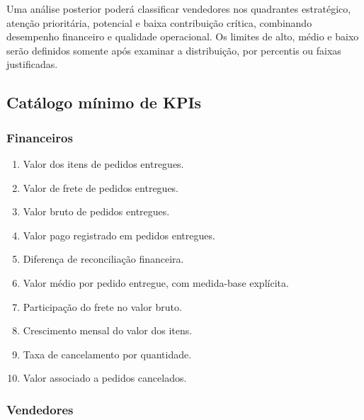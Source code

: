 \documentclass[12pt,a4paper]{article}
\providecommand{\tightlist}{
  \setlength{\itemsep}{0pt}\setlength{\parskip}{0pt}
}
\begin{document}
Uma análise posterior poderá classificar vendedores nos quadrantes
estratégico, atenção prioritária, potencial e baixa contribuição
crítica, combinando desempenho financeiro e qualidade operacional. Os
limites de alto, médio e baixo serão definidos somente após examinar a
distribuição, por percentis ou faixas justificadas.

\subsection{Catálogo mínimo de
KPIs}\label{docs__analytics__contrato_analitico.md__catuxe1logo-muxednimo-de-kpis}

\subsubsection{Financeiros}\label{docs__analytics__contrato_analitico.md__financeiros}

\begin{enumerate}
\def\labelenumi{\arabic{enumi}.}
\tightlist
\item
  Valor dos itens de pedidos entregues.
\item
  Valor de frete de pedidos entregues.
\item
  Valor bruto de pedidos entregues.
\item
  Valor pago registrado em pedidos entregues.
\item
  Diferença de reconciliação financeira.
\item
  Valor médio por pedido entregue, com medida-base explícita.
\item
  Participação do frete no valor bruto.
\item
  Crescimento mensal do valor dos itens.
\item
  Taxa de cancelamento por quantidade.
\item
  Valor associado a pedidos cancelados.
\end{enumerate}

\subsubsection{Vendedores}\label{docs__analytics__contrato_analitico.md__vendedores}
\end{document}
